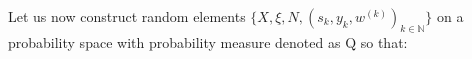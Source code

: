 \documentclass[12pt,a4paper]{amsart}
\numberwithin{equation}{section}
\theoremstyle{plain}
\theoremstyle{definition}
\theoremstyle{remark}
\begin{document}
	Let us now construct random elements $\big\{X, \xi, N, (s_k, y_k,w^{(k)})_{k\in \mathbb N}\big\}$ on a probability space with probability measure denoted as $\mathrm Q$ so that: 	
\end{document}
